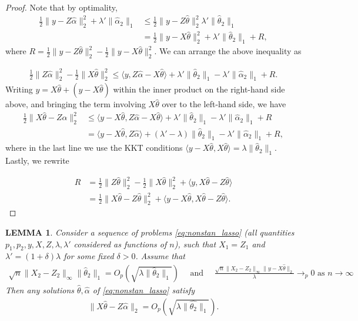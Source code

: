 \documentclass[a4paper]{article}
\newtheorem{lemma}{LEMMA}
\newcommand{\ra}{\rangle}
\newcommand{\la}{\langle}
\begin{document}
\begin{proof}
Note that by optimality,
\begin{align*}
\frac{1}{2}\|y-Z\hat{\alpha}\|^2_2 + \lambda'\|\hat{\alpha}_2\|_1 &\leq \frac{1}{2}\|y-Z\hat{\theta}\|_2^2 \lambda'\|\hat{\theta}_2\|_1\\
&= \frac{1}{2}\|y-X\hat{\theta}\|_2^2 + \lambda'\|\hat{\theta}_2\|_1 + R,
\end{align*}
where $R = \frac{1}{2}\|y-Z\hat{\theta}\|_2^2 - \frac{1}{2}\|y-X\hat{\theta}\|_2^2$. We can arrange the above inequality as

\begin{align*}
\frac{1}{2}\|Z\hat{\alpha}\|_2^2 - \frac{1}{2}\|X\hat{\theta}\|_2^2 \leq \la y, Z\hat{\alpha} - X\hat{\theta}\ra + \lambda'\|\hat{\theta}_2\|_1 - \lambda'\|\hat{\alpha}_2\|_1 + R.
\end{align*}
Writing $y = X\hat{\theta} + (y - X\hat{\theta})$ within the inner product on the right-hand side above, and bringing the term involving $X\hat{\theta}$ over to the left-hand side, we have
\begin{align*}
\frac{1}{2}\|X\hat{\theta} - Z\hat{\alpha}\|_2^2 &\leq \la y-X\hat{\theta}, Z\hat{\alpha} - X\hat{\theta}\ra + \lambda'\|\hat{\theta}_2\|_1 - \lambda'\|\hat{\alpha}_2\|_1 + R\\
&= \la y-X\hat{\theta}, Z\hat{\alpha} \ra + (\lambda'-\lambda)\|\hat{\theta}_2\|_1 - \lambda'\|\hat{\alpha}_2\|_1 + R,
\end{align*}
where in the last line we use the KKT conditions $\la y-X\hat{\theta}, X\hat{\theta}\ra = \lambda\|\hat{\theta}_2\|_1$. Lastly, we rewrite

\begin{align*}
R &= \frac{1}{2}\|Z\hat{\theta}\|_2^2 - \frac{1}{2}\|X\hat{\theta}\|_2^2 + \la y, X\hat{\theta} - Z\hat{\theta}\ra \\
&= \frac{1}{2}\|X\hat{\theta}-Z\hat{\theta}\|_2^2 + \la y-X\hat{\theta}, X\hat{\theta}-Z\hat{\theta}\ra.
\end{align*}
\end{proof}


\begin{lemma}
Consider a sequence of problems \eqref{eq:nonstan_lasso} (all quantities $p_1,p_2, y, X,Z,\lambda,\lambda'$ considered as functions of $n$), such that $X_1=Z_1$ and $\lambda' = (1+\delta)\lambda$ for some fixed $\delta>0$. Assume that 
\begin{align*}
\sqrt{n}\|X_2-Z_2\|_\infty\|\hat{\theta}_2\|_1 = O_p(\sqrt{\lambda\|\hat{\theta}_2\|_1}) \quad \text{ and } \quad \frac{\sqrt{n}\|X_2-Z_2\|_\infty\|y-X\hat{\theta}\|_2}{\lambda} \rightarrow_p 0 \text{ as } n\rightarrow\infty
\end{align*}
Then any solutions $\hat{\theta},\hat{\alpha}$ of \eqref{eq:nonstan_lasso} satisfy
\begin{align*}
\|X\hat{\theta} - Z\hat{\alpha}\|_2 = O_p(\sqrt{\lambda\|\hat{\theta_2}\|_1}).
\end{align*}
\label{lemma:lemma_4}
\end{lemma}
\end{document}

